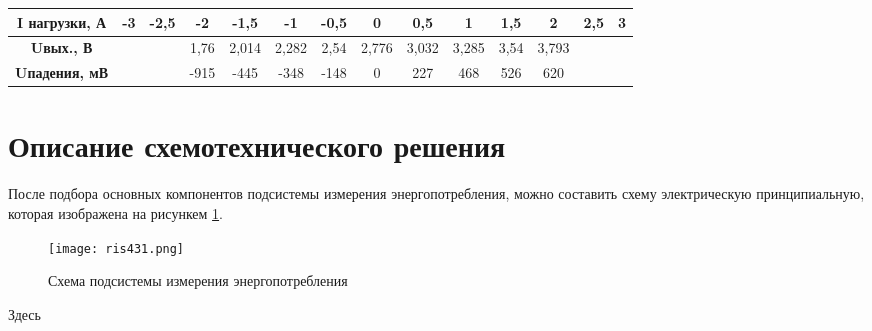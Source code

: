 \begin{table}[H]
\begin{turn}{90}
\begin{tabular}{|c|c|c|c|c|c|c|c|c|c|c|c|c|c|}
      \hline
      \textbf{I нагрузки, А} & -3    & -2,5  & -2    & -1,5  & -1    & -0,5  & 0     & 0,5   & 1     & 1,5   & 2     & 2,5   & 3 \bigstrut\\
      \hline
      \textbf{Uвых., В} &       &       & 1,76  & 2,014 & 2,282 & 2,54  & 2,776 & 3,032 & 3,285 & 3,54  & 3,793 &       &  \bigstrut\\
      \hline
      \textbf{Uпадения, мВ} &       &       & -915  & -445  & -348  & -148  & 0     & 227   & 468   & 526   & 620   &       &  \bigstrut\\
      \hline
      \end{tabular}%
    \label{tab:I_meas}%
    \end{turn}
  \end{table}%
  
  
  

\section{Описание схемотехнического решения}
\hspace{1cm} 

После подбора основных компонентов подсистемы измерения энергопотребления, можно составить схему электрическую
принципиальную, которая изображена на рисункем \ref{ris:431}.

\begin{figure}[H]
\centering
\texttt{[image: ris431.png]}
\caption{Схема подсистемы измерения энергопотребления}
\label{ris:431}
\end{figure}

Здесь 

